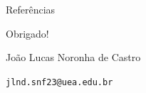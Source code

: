 \documentclass[11pt]{beamer}
\makeatletter
\newcommand{\email}{jlnd.snf23@uea.edu.br}
\makeatother
\begin{document}
\begin{frame}[allowframebreaks]{Referências}
\nocite{*} %

\end{frame}

\begin{frame}
\begin{center}
    \Huge Obrigado!
    
    \vspace{0.8cm}
    
    \large João Lucas Noronha de Castro
    
    \vspace{0.2cm}
    
    \small \texttt{\email}
\end{center}
\end{frame}
\end{document}
